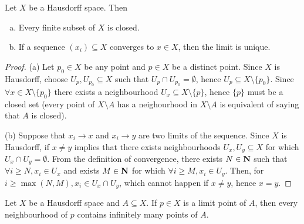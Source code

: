 \begin{proposition}
  \label{prop: Hausdorff properties}
  Let \(X\) be a Hausdorff space. Then
  \begin{enumerate}[(a)]
    \item Every finite subset of \(X\) is closed.
    \item If a sequence \((x_i) \subseteq X\) converges to \(x \in X\), then the
      limit is unique.
  \end{enumerate}
\end{proposition}

\begin{proof}
  (a) Let \(p_0 \in X\) be any point and \(p \in X\) be a distinct point. Since
  \(X\) is Hausdorff, choose \(U_p, U_{p_0} \subseteq X\) such that \(U_p \cap
  U_{p_0} = \emptyset\), hence  \(U_p \subseteq X \setminus \{p_0\}\). Since
  \(\forall x \in X \setminus \{p_0\}\) there exists a neighbourhood \(U_x
  \subseteq X \setminus \{p\}\), hence \(\{p\}\) must be a closed set (every
  point of \(X \setminus A\) has a neighourhood in \(X \setminus A\) is
  equivalent of saying that \(A\) is closed).

  (b) Suppose that \(x_i \to x\) and \(x_i \to y\) are two limits of the
  sequence. Since \(X\) is Hausdorff, if \(x \neq y\) implies that there exists
  neighbourhoods \(U_x, U_y \subseteq X\) for which \(U_x \cap U_y =
  \emptyset\). From the definition of convergence, there exists \(N \in
  \mathbf{N}\) such that \(\forall i \geq N, x_i \in U_x\) and exists \(M \in \mathbf{N}\)
  for which \(\forall i \geq M, x_i \in U_y\). Then, for \(i \geq
  \max(N, M), x_i \in U_x \cap U_y\), which cannot happen if \(x \neq y\), hence
  \(x = y\).
\end{proof}

\begin{proposition}
  Let \(X\) be a Hausdorff space and \(A \subseteq X\). If \(p \in X\) is a
  limit point of \(A\), then every neighbourhood of \(p\) contains infinitely
  many points of \(A\).
\end{proposition}

